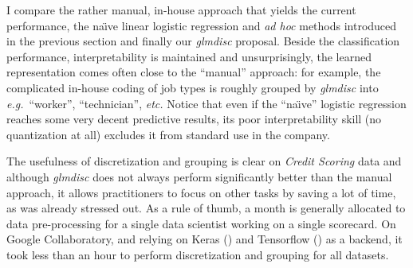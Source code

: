I compare the rather manual, in-house approach that yields the current performance, the na\"{\i}ve linear logistic regression and \textit{ad hoc} methods introduced in the previous section and finally our \textit{glmdisc} proposal. Beside the classification performance, interpretability is maintained and unsurprisingly, the learned representation comes often close to the ``manual'' approach: for example, the complicated in-house coding of job types is roughly grouped by \textit{glmdisc} into \textit{e.g.}\ ``worker'', ``technician'', \textit{etc.} Notice that even if the ``na\"{\i}ve'' logistic regression reaches some very decent predictive results, its poor interpretability skill (no quantization at all) excludes it from standard use in the company.

The usefulness of discretization and grouping is clear on \textit{Credit Scoring} data and although \textit{glmdisc} does not always perform significantly better than the manual approach, it allows practitioners to focus on other tasks by saving a lot of time, as was already stressed out. As a rule of thumb, a month is generally allocated to data pre-processing for a single data scientist working on a single scorecard. On Google Collaboratory, and relying on Keras (\cite{chollet2015keras}) and Tensorflow (\cite{tensorflow2015-whitepaper}) as a backend, it took less than an hour to perform discretization and grouping for all datasets.



